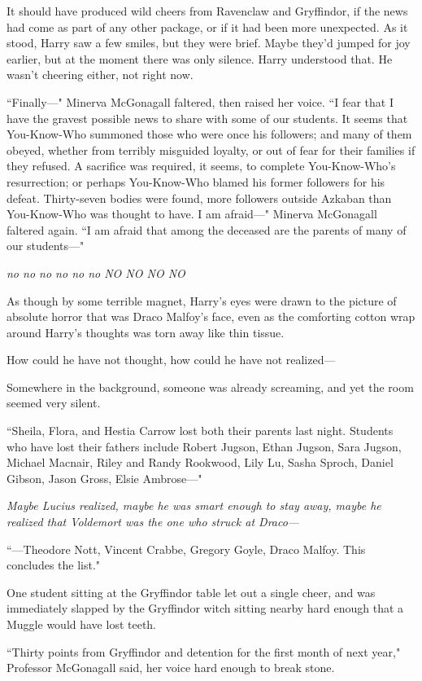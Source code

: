 It should have produced wild cheers from Ravenclaw and Gryffindor, if the news had come as part of any other package, or if it had been more unexpected. As it stood, Harry saw a few smiles, but they were brief. Maybe they'd jumped for joy earlier, but at the moment there was only silence. Harry understood that. He wasn't cheering either, not right now.

``Finally---" Minerva McGonagall faltered, then raised her voice. ``I fear that I have the gravest possible news to share with some of our students. It seems that You-Know-Who summoned those who were once his followers; and many of them obeyed, whether from terribly misguided loyalty, or out of fear for their families if they refused. A sacrifice was required, it seems, to complete You-Know-Who's resurrection; or perhaps You-Know-Who blamed his former followers for his defeat. Thirty-seven bodies were found, more followers outside Azkaban than You-Know-Who was thought to have. I am afraid---" Minerva McGonagall faltered again. ``I am afraid that among the deceased are the parents of many of our students---"

\emph{no no no no no no NO NO NO NO}

As though by some terrible magnet, Harry's eyes were drawn to the picture of absolute horror that was Draco Malfoy's face, even as the comforting cotton wrap around Harry's thoughts was torn away like thin tissue.

How could he have not thought, how could he have not realized---

Somewhere in the background, someone was already screaming, and yet the room seemed very silent.

``Sheila, Flora, and Hestia Carrow lost both their parents last night. Students who have lost their fathers include Robert Jugson, Ethan Jugson, Sara Jugson, Michael Macnair, Riley and Randy Rookwood, Lily Lu, Sasha Sproch, Daniel Gibson, Jason Gross, Elsie Ambrose---"

\emph{Maybe Lucius realized, maybe he was smart enough to stay away, maybe he realized that Voldemort was the one who struck at Draco---}

``---Theodore Nott, Vincent Crabbe, Gregory Goyle, Draco Malfoy. This concludes the list."

One student sitting at the Gryffindor table let out a single cheer, and was immediately slapped by the Gryffindor witch sitting nearby hard enough that a Muggle would have lost teeth.

``Thirty points from Gryffindor and detention for the first month of next year," Professor McGonagall said, her voice hard enough to break stone.

